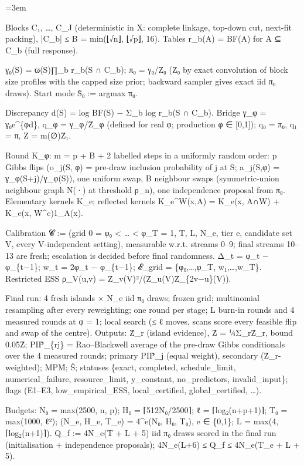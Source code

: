 \documentclass[11pt]{report}
\newenvironment{mdblock}{\begingroup\mdfont\raggedright\setlength{\parindent}{0pt}\setlength{\parskip}{0.55em}\emergencystretch=3em}{\par\endgroup}
\begin{document}
\begin{mdblock}
\begin{mdbul}
\item Blocks C₁, …, C\_J (deterministic in X: complete linkage, top-down cut, next-fit packing), |C\_b| ≤ B = min(⌊√n⌋, ⌊√p⌋, 16). Tables r\_b(A) = BF(A) for A ⊆ C\_b (full response).
\item γ₀(S) = ϖ(S)∏\_b r\_b(S ∩ C\_b); π₀ = γ₀/Z̄₀ (Z̄₀ by exact convolution of block size profiles with the capped size prior; backward sampler gives exact iid π₀ draws). Start mode S̃₀ := argmax π₀.
\item Discrepancy d(S) = log BF(S) − Σ\_b log r\_b(S ∩ C\_b). Bridge γ\_φ = γ₀e\textasciicircum{}\{φd\}, q\_φ = γ\_φ/Z̄\_φ (defined for real φ; production φ ∈ [0,1]); q₀ = π₀, q₁ = π, Z = m(∅)Z̄₁.
\item Round K\_φ: m = p + B + 2 labelled steps in a uniformly random order: p Gibbs flips (o\_j(S, φ) = pre-draw inclusion probability of j at S; a\_j(S,φ) = γ\_φ(S+j)/γ\_φ(S)), one uniform swap, B neighbour swaps (symmetric-union neighbour graph N(·) at threshold ρ\_n), one independence proposal from π₀. Elementary kernels K\_e; reflected kernels K\_e\textasciicircum{}W(x,A) = K\_e(x, A∩W) + K\_e(x, W\textasciicircum{}c)1\_A(x).
\item Calibration 𝓒 := (grid 0 = φ₀ < … < φ\_T = 1, T, L, N\_e, tier e, candidate set V, every V-independent setting), measurable w.r.t. streams 0–9; final streams 10–13 are fresh; escalation is decided before final randomness. Δ\_t = φ\_t − φ\_\{t−1\}; w\_t = 2φ\_t − φ\_\{t−1\}; 𝓔\_grid = \{φ₀,…,φ\_T, w₁,…,w\_T\}. Restricted ESS ρ\_V(u,v) = Z̄\_v(V)²/(Z̄\_u(V)Z̄\_\{2v−u\}(V)).
\item Final run: 4 fresh islands × N\_e iid π₀ draws; frozen grid; multinomial resampling after every reweighting; one round per stage; L burn-in rounds and 4 measured rounds at φ = 1; local search (≤ ℓ moves, scans score every feasible flip and swap of the centre). Outputs: Ẑ\_r (island evidence), Ẑ = ¼Σ\_rẐ\_r, bound 0.05Ẑ; PIP̂\_\{rj\} = Rao–Blackwell average of the pre-draw Gibbs conditionals over the 4 measured rounds; primary PIP̂\_j (equal weight), secondary (Ẑ\_r-weighted); MPM̂; Ŝ; statuses \{exact, completed, schedule\_limit, numerical\_failure, resource\_limit, y\_constant, no\_predictors, invalid\_input\}; flags (E1–E3, low\_empirical\_ESS, local\_certified, global\_certified, …).
\item Budgets: N₀ = max(2500, n, p); H₀ = ⌈512N₀/2500⌉; ℓ = ⌈log₂(n+p+1)⌉; T₀ = max(1000, ℓ²); (N\_e, H\_e, T\_e) = 4\textasciicircum{}e(N₀, H₀, T₀), e ∈ \{0,1\}; L = max(4, ⌈log₂(n+1)⌉). Q\_f := 4N\_e(T + L + 5) iid π₀ draws scored in the final run (initialisation + independence proposals); 4N\_e(L+6) ≤ Q\_f ≤ 4N\_e(T\_e + L + 5).

\end{mdbul}
\end{mdblock}
\end{document}
